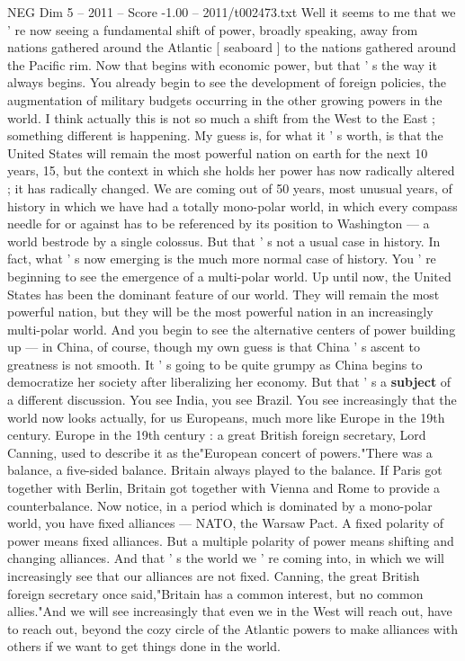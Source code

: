 \begin{textsample}{NEG Dim 5 – 2011 – Score -1.00 – 2011/t002473.txt}
Well it seems to me that we ' re now seeing a fundamental shift of power, broadly speaking, away from nations gathered around the Atlantic [ seaboard ] to the nations gathered around the Pacific rim.
Now that begins with economic power, but that ' s the way it always begins.
You already begin to see the development of foreign policies, the augmentation of military budgets occurring in the other growing powers in the world.
I think actually this is not so much a shift from the West to the East ; something different is happening.
My guess is, for what it ' s worth, is that the United States will remain the most powerful nation on earth for the next 10 years, 15, but the context in which she holds her power has now radically altered ; it has radically changed.
We are coming out of 50 years, most unusual years, of history in which we have had a totally mono-polar world, in which every compass needle for or against has to be referenced by its position to Washington — a world bestrode by a single colossus.
But that ' s not a usual case in history.
In fact, what ' s now emerging is the much more normal case of history.
You ' re beginning to see the emergence of a multi-polar world.
Up until now, the United States has been the dominant feature of our world.
They will remain the most powerful nation, but they will be the most powerful nation in an increasingly multi-polar world.
And you begin to see the alternative centers of power building up — in China, of course, though my own guess is that China ' s ascent to greatness is not smooth.
It ' s going to be quite grumpy as China begins to democratize her society after liberalizing her economy.
But that ' s a \textbf{subject} of a different discussion.
You see India, you see Brazil.
You see increasingly that the world now looks actually, for us Europeans, much more like Europe in the 19th century.
Europe in the 19th century : a great British foreign secretary, Lord Canning, used to describe it as the"European concert of powers."There was a balance, a five-sided balance.
Britain always played to the balance.
If Paris got together with Berlin, Britain got together with Vienna and Rome to provide a counterbalance.
Now notice, in a period which is dominated by a mono-polar world, you have fixed alliances — NATO, the Warsaw Pact.
A fixed polarity of power means fixed alliances.
But a multiple polarity of power means shifting and changing alliances.
And that ' s the world we ' re coming into, in which we will increasingly see that our alliances are not fixed.
Canning, the great British foreign secretary once said,"Britain has a common interest, but no common allies."And we will see increasingly that even we in the West will reach out, have to reach out, beyond the cozy circle of the Atlantic powers to make alliances with others if we want to get things done in the world.

\end{textsample}
